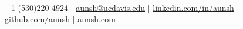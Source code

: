 \begin{center}
    \centerline{}
    \vspace{4pt}
    \small{\faPhone \hspace{0.1 cm}} +1 (530)220-4924 $|$
    \href{mailto:aunsh@ucdavis.edu}{\faEnvelope \hspace{0.2 cm} aunsh@ucdavis.edu} $|$ 
    \href{http://linkedin.com/in/aunsh}{\faLinkedin \hspace{0.2 cm}linkedin.com/in/aunsh} $|$
    \href{https://github.com/aunsh}{\faGithub \hspace{0.2 cm}github.com/aunsh} $|$  
    \href{https://aunsh.com}{\faExternalLink \hspace{0.2 cm}aunsh.com}
\end{center}